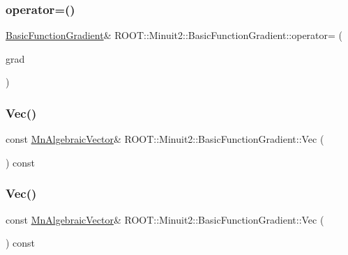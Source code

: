 \subsubsection{\texorpdfstring{operator=()}{operator=()}\hspace{0.1cm}{\footnotesize\ttfamily [2/2]}}
{\footnotesize\ttfamily \mbox{\hyperlink{classROOT_1_1Minuit2_1_1BasicFunctionGradient}{Basic\+Function\+Gradient}}\& R\+O\+O\+T\+::\+Minuit2\+::\+Basic\+Function\+Gradient\+::operator= (\begin{DoxyParamCaption}\item[{const \mbox{\hyperlink{classROOT_1_1Minuit2_1_1BasicFunctionGradient}{Basic\+Function\+Gradient}} \&}]{grad }\end{DoxyParamCaption})\hspace{0.3cm}{\ttfamily [inline]}}

\mbox{\label{classROOT_1_1Minuit2_1_1BasicFunctionGradient_a4c0d60175db412ac03313f824a055886}} 
\subsubsection{\texorpdfstring{Vec()}{Vec()}\hspace{0.1cm}{\footnotesize\ttfamily [1/2]}}
{\footnotesize\ttfamily const \mbox{\hyperlink{namespaceROOT_1_1Minuit2_a62ed97730a1ca8d3fbaec64a19aa11c9}{Mn\+Algebraic\+Vector}}\& R\+O\+O\+T\+::\+Minuit2\+::\+Basic\+Function\+Gradient\+::\+Vec (\begin{DoxyParamCaption}{ }\end{DoxyParamCaption}) const\hspace{0.3cm}{\ttfamily [inline]}}

\mbox{\label{classROOT_1_1Minuit2_1_1BasicFunctionGradient_a4c0d60175db412ac03313f824a055886}} 
\subsubsection{\texorpdfstring{Vec()}{Vec()}\hspace{0.1cm}{\footnotesize\ttfamily [2/2]}}
{\footnotesize\ttfamily const \mbox{\hyperlink{namespaceROOT_1_1Minuit2_a62ed97730a1ca8d3fbaec64a19aa11c9}{Mn\+Algebraic\+Vector}}\& R\+O\+O\+T\+::\+Minuit2\+::\+Basic\+Function\+Gradient\+::\+Vec (\begin{DoxyParamCaption}{ }\end{DoxyParamCaption}) const\hspace{0.3cm}{\ttfamily [inline]}}



